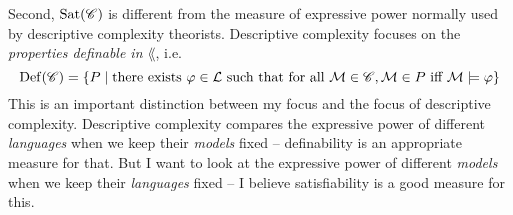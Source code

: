 \documentclass[letterpaper]{article}
\begin{document}
Second, $\mathrm{Sat}( \mathscr{C} )$ is different from the measure of expressive power normally used by descriptive complexity theorists.  Descriptive complexity focuses on the \emph{properties definable in $\lang$}, i.e.
\[
    \mathrm{Def}( \mathscr{C} ) = \{ P \mid \textrm{there exists } \varphi \in \mathcal{L} \textrm{ such that for all } \mathcal{M} \in \mathscr{C}, \mathcal{M} \in P \textrm{ iff } \mathcal{M} \models \varphi \}
\]
This is an important distinction between my focus and the focus of descriptive complexity.  Descriptive complexity compares the expressive power of different \emph{languages} when we keep their \emph{models} fixed -- definability is an appropriate measure for that.  But I want to look at the expressive power of different \emph{models} when we keep their \emph{languages} fixed -- I believe satisfiability is a good measure for this.
\end{document}
